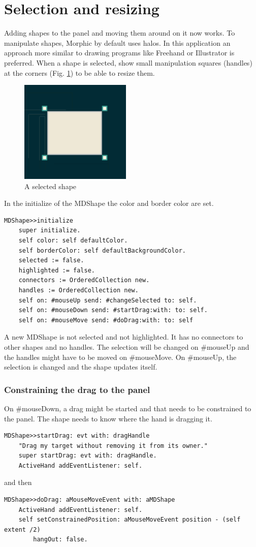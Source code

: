 \documentclass[10pt, twoside]{article}   	%
\begin{document}
\section{Selection and resizing}
Adding shapes to the panel and moving them around on it now works.
To manipulate shapes, Morphic by default uses halos. In this application
an approach more similar to drawing programs like Freehand or Illustrator
is preferred. When a shape is selected, show small manipulation squares
(handles) at the corners (Fig. \ref{selectedShape}) to be able to resize them.
\begin{figure}[htb]
\begin{center}
\includegraphics[width=150pt]{SelectedShape.png}
\caption{A selected shape}
\label{selectedShape}
\end{center}
\end{figure}
In the initialize of the MDShape the color and border color
are set.
\begin{verbatim}
MDShape>>initialize
    super initialize.
    self color: self defaultColor.
    self borderColor: self defaultBackgroundColor.
    selected := false.
    highlighted := false.
    connectors := OrderedCollection new.
    handles := OrderedCollection new.
    self on: #mouseUp send: #changeSelected to: self.
    self on: #mouseDown send: #startDrag:with: to: self.
    self on: #mouseMove send: #doDrag:with: to: self
\end{verbatim}
A new MDShape is not selected and not highlighted.
It has no connectors to other shapes and no handles.
The selection will be changed on \#mouseUp and 
the handles might have to be moved on \#mouseMove.
On \#mouseUp, the selection is changed and the shape
updates itself. 
\subsubsection{Constraining the drag to the panel}
On \#mouseDown, a drag might be started
and  that needs to be constrained to the panel.
The shape needs to know where the hand is dragging it. 
\begin{verbatim}
MDShape>>startDrag: evt with: dragHandle
    "Drag my target without removing it from its owner."
    super startDrag: evt with: dragHandle.
    ActiveHand addEventListener: self.
\end{verbatim}
and then
\begin{verbatim}
MDShape>>doDrag: aMouseMoveEvent with: aMDShape 
    ActiveHand addEventListener: self.
    self setConstrainedPosition: aMouseMoveEvent position - (self extent /2)
        hangOut: false.	
\end{verbatim}
\end{document}
